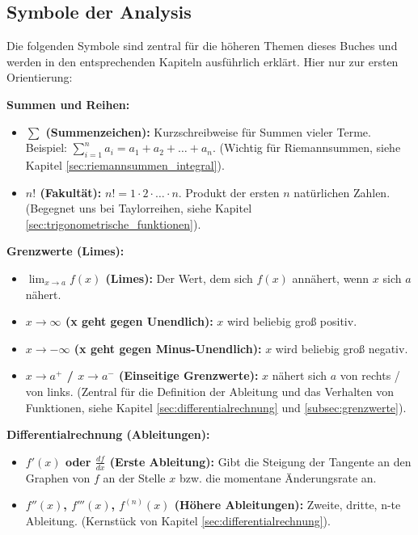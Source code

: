 \subsection{Symbole der Analysis}
Die folgenden Symbole sind zentral für die höheren Themen dieses Buches und werden in den entsprechenden Kapiteln ausführlich erklärt. Hier nur zur ersten Orientierung:

\textbf{Summen und Reihen:}
\begin{itemize}
    \item \textbf{$\sum$ (Summenzeichen):} Kurzschreibweise für Summen vieler Terme. Beispiel: $\sum_{i=1}^{n} a_i = a_1+a_2+\dots+a_n$. (Wichtig für Riemannsummen, siehe Kapitel \ref{sec:riemannsummen_integral}).
    \item \textbf{$n!$ (Fakultät):} $n! = 1 \cdot 2 \cdot \dots \cdot n$. Produkt der ersten $n$ natürlichen Zahlen. (Begegnet uns bei Taylorreihen, siehe Kapitel \ref{sec:trigonometrische_funktionen}).
\end{itemize}

\textbf{Grenzwerte (Limes):}
\begin{itemize}
    \item \textbf{$\lim_{x \to a} f(x)$ (Limes):} Der Wert, dem sich $f(x)$ annähert, wenn $x$ sich $a$ nähert.
    \item \textbf{$x \to \infty$ (x geht gegen Unendlich):} $x$ wird beliebig groß positiv.
    \item \textbf{$x \to -\infty$ (x geht gegen Minus-Unendlich):} $x$ wird beliebig groß negativ.
    \item \textbf{$x \to a^+$ / $x \to a^-$ (Einseitige Grenzwerte):} $x$ nähert sich $a$ von rechts / von links.
    (Zentral für die Definition der Ableitung und das Verhalten von Funktionen, siehe Kapitel \ref{sec:differentialrechnung} und \ref{subsec:grenzwerte}).
\end{itemize}

\textbf{Differentialrechnung (Ableitungen):}
\begin{itemize}
    \item \textbf{$f'(x)$ oder $\frac{df}{dx}$ (Erste Ableitung):} Gibt die Steigung der Tangente an den Graphen von $f$ an der Stelle $x$ bzw. die momentane Änderungsrate an.
    \item \textbf{$f''(x)$, $f'''(x)$, $f^{(n)}(x)$ (Höhere Ableitungen):} Zweite, dritte, n-te Ableitung.
    (Kernstück von Kapitel \ref{sec:differentialrechnung}).
\end{itemize}

